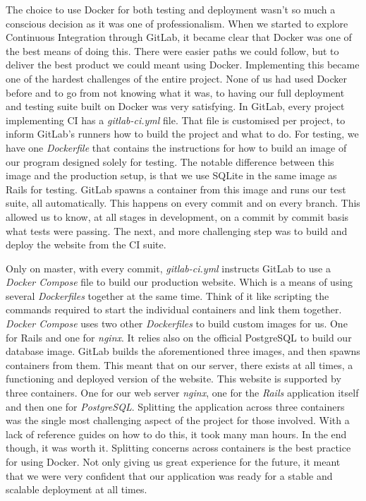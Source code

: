\documentclass{l3proj}
\begin{document}
The choice to use Docker for both testing and deployment wasn't so much a conscious decision as it was one of professionalism. When we started to explore Continuous Integration through GitLab, it became clear that Docker was one of the best means of doing this. There were easier paths we could follow, but to deliver the best product we could meant using Docker. Implementing this became one of the hardest challenges of the entire project. None of us had used Docker before and to go from not knowing what it was, to having our full deployment and testing suite built on Docker was very satisfying. In GitLab, every project implementing CI has a \textit{gitlab-ci.yml} file. That file is customised per project, to inform GitLab's runners how to build the project and what to do. For testing, we have one \textit{Dockerfile} that contains the instructions for how to build an image of our program designed solely for testing. The notable difference between this image and the production setup, is that we use SQLite in the same image as Rails for testing. GitLab spawns a container from this image and runs our test suite, all automatically. This happens on every commit and on every branch. This allowed us to know, at all stages in development, on a commit by commit basis what tests were passing. The next, and more challenging step was to build and deploy the website from the CI suite.

Only on master, with every commit, \textit{gitlab-ci.yml} instructs GitLab to use a \textit{Docker Compose} file to build our production website. Which is a means of using several \textit{Dockerfiles} together at the same time. Think of it like scripting the commands required to start the individual containers and link them together. \textit{Docker Compose} uses two other \textit{Dockerfiles} to build custom images for us. One for Rails and one for \textit{nginx}. It relies also on the official PostgreSQL to build our database image. GitLab builds the aforementioned three images, and then spawns containers from them. This meant that on our server, there exists at all times, a functioning and deployed version of the website. This website is supported by three containers. One for our web server \textit{nginx}, one for the \textit{Rails} application itself and then one for \textit{PostgreSQL}. Splitting the application across three containers was the single most challenging aspect of the project for those involved. With a lack of reference guides on how to do this, it took many man hours. In the end though, it was worth it. Splitting concerns across containers is the best practice for using Docker. Not only giving us great experience for the future, it meant that we were very confident that our application was ready for a stable and scalable deployment at all times.
\end{document}
